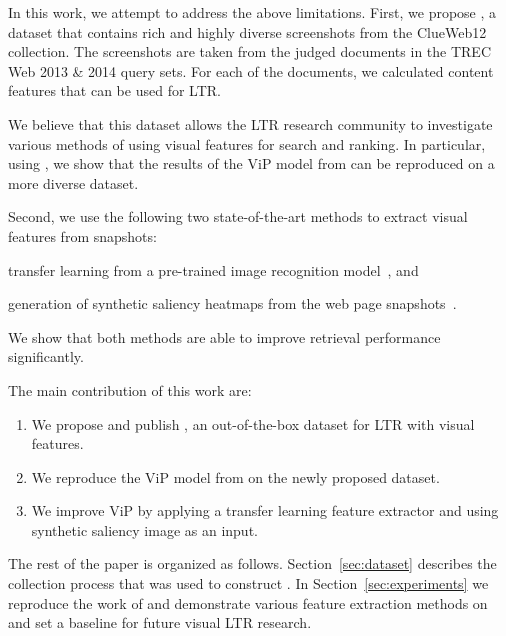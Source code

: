
In this work, we attempt to address the above limitations.
First, we propose \datasetname, a dataset that contains rich and highly diverse screenshots from the ClueWeb12 collection. The screenshots are taken from the judged documents in the TREC Web 2013 \& 2014 query sets. For each of the documents, we calculated content features that can be used for \ac{LTR}.

We believe that this dataset allows the \ac{LTR} research community to investigate various methods of using visual features for search and ranking.
In particular, using \datasetname, we show that the results of the ViP model from \citet{fan2017learning} can be reproduced on a more diverse dataset.

Second, we use the following two state-of-the-art methods to extract visual features from snapshots:
\begin{inparaenum}[(i)]
\item transfer learning from a pre-trained image recognition model~\cite{donahue2014decaf,simonyan2014very}, and
\item generation of synthetic saliency heatmaps from the web page snapshots~\cite{shen2014webpage,shan2017two}.
\end{inparaenum}
We show that both methods are able to improve retrieval performance significantly.

The main contribution of this work are:
\begin{enumerate}  
\item We propose and publish \datasetname, an out-of-the-box dataset for \ac{LTR} with visual features.
\item We reproduce the ViP model from \cite{fan2017learning} on the newly proposed dataset.
\item We improve ViP by applying a transfer learning feature extractor and using synthetic saliency image as an input.
\end{enumerate}

 The rest of the paper is organized as follows. Section~\ref{sec:dataset} describes the collection process that was used to construct \datasetname. In Section~\ref{sec:experiments} we reproduce the work of \citet{fan2017learning} and demonstrate various feature extraction methods on \datasetname and set a baseline for future visual \ac{LTR} research.  